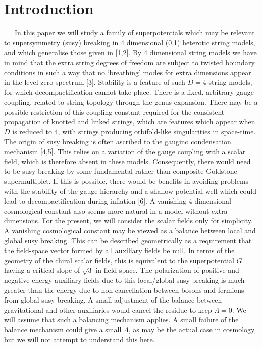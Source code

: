 \documentclass[a4paper,12pt]{article}
\begin{document}
\section{Introduction}
\ \ \ In this paper we will study a family of superpotentials
which may be relevant to supersymmetry (susy) breaking in 4
dimensional (0,1) heterotic string models, and which generalise
those given in [1,2]. By 4 dimensional string models we have in
mind that the extra string degrees of freedom are subject to
twisted boundary conditions in such a way that no `breathing'
modes for extra dimensions appear in the level zero spectrum [3].
Stability is a feature of such $D=4$ string models, for which
decompactification cannot take place. There is a fixed, arbitrary
gauge coupling, related to string topology through the genus
expansion. There may be a possible restriction of this coupling
constant required for the consistent propagation of knotted and
linked strings, which are features which appear when $D$ is
reduced to 4, with strings producing orbifold-like singularities
in space-time. The origin of susy breaking is often ascribed to
the gaugino condensation mechanism [4,5]. This relies on a
variation of the gauge coupling with a scalar field, which is
therefore absent in these models. Consequently, there would need
to be susy breaking by some fundamental rather than composite
Goldstone supermultiplet. If this is possible, there would be
benefits in avoiding problems with the stability of the gauge
hierarchy and a shallow potential well which could lead to
decompactification during inflation [6]. A vanishing 4 dimensional
cosmological constant also seems more natural in a model without
extra dimensions. For the present, we will consider the scalar
fields only for simplicity. A vanishing cosmological constant may
be viewed as a balance between local and global susy breaking.
This can be described geometrically as a requirement that the
field-space vector formed by all auxiliary fields be null. In
terms of the geometry of the chiral scalar fields, this is
equivalent to the superpotential $G$ having a critical slope of
$\sqrt{3}$ in field space. The polarization of positive and
negative energy auxiliary fields due to this local/global susy
breaking is much greater than the energy due to non-cancellation
between bosons and fermions from global susy breaking. A small
adjustment of the balance between gravitational and other
auxiliaries would cancel the residue to keep $\Lambda =0$. We will
assume that such a balancing mechanism applies. A small failure of
the balance mechanism could give a small $\Lambda$, as may be the
actual case in cosmology, but we will not attempt to understand
this here.
\end{document}
